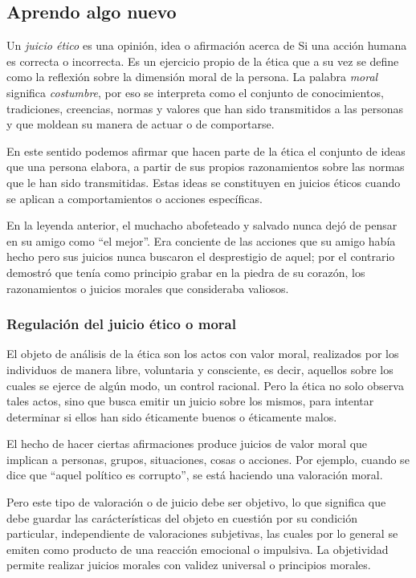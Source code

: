 \documentclass[10pt,twoside]{article}
\begin{document}
\subsection*{Aprendo algo nuevo}
Un \emph{juicio ético} es una opinión, idea o afirmación acerca de Si una acción humana es correcta o incorrecta. Es un ejercicio propio de la ética que a su vez se define como la reflexión sobre la dimensión moral de la persona. La palabra \emph{moral} significa \emph{costumbre}, por eso se interpreta como el conjunto de conocimientos, tradiciones, creencias, normas y valores que han sido transmitidos a las personas y que moldean su manera de actuar o de comportarse.

En este sentido podemos afirmar que hacen parte de la ética el conjunto de ideas que una persona elabora, a partir de sus propios razonamientos sobre las normas que le han sido transmitidas. Estas ideas se constituyen en juicios éticos cuando se aplican a comportamientos o acciones específicas.

En la leyenda anterior, el muchacho abofeteado y salvado nunca dejó de pensar en su amigo como “el mejor”. Era conciente de las acciones que su amigo había hecho pero sus juicios nunca buscaron el desprestigio de aquel; por el contrario demostró que tenía como principio grabar en la piedra de su corazón, los razonamientos o juicios morales que consideraba valiosos.
\subsubsection*{Regulación del juicio ético o moral}
El objeto de análisis de la ética son los actos con valor moral, realizados por los individuos de manera libre, voluntaria y consciente, es decir, aquellos sobre los cuales se ejerce de algún modo, un control racional. Pero la ética no solo observa tales actos, sino que busca emitir un juicio sobre los mismos, para intentar determinar si ellos han sido éticamente buenos o éticamente malos.

El hecho de hacer ciertas afirmaciones produce juicios de valor moral que implican a personas, grupos, situaciones, cosas o acciones. Por ejemplo, cuando se dice que “aquel político es corrupto”, se está haciendo una valoración moral.

Pero este tipo de valoración o de juicio debe ser objetivo, lo que significa que debe guardar las carácterísticas del objeto en cuestión por su condición particular, independiente de valoraciones subjetivas, las cuales por lo general se emiten como producto de una reacción emocional o impulsiva.
La objetividad permite realizar juicios morales con validez universal o principios morales.
\end{document}

